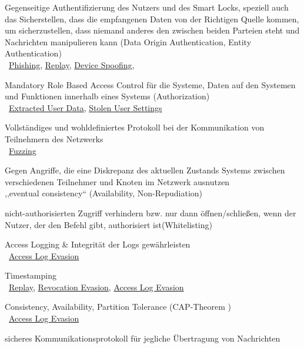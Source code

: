     \begin{SA}[noitemsep]
        \item \label{sa:1}Gegenseitige Authentifizierung des Nutzers und des Smart Locks, speziell auch das Sicherstellen, dass die empfangenen Daten von der Richtigen Quelle kommen, um sicherzustellen, dass niemand anderes den zwischen beiden Parteien steht und Nachrichten manipulieren kann (Data Origin Authentication, Entity Authentication)\\
            \textrightarrow\ \hyperref[vuln:phishing]{Phishing}, \hyperref[vuln:replay]{Replay}, \hyperref[vuln:spoofing]{Device Spoofing}, 
        \item \label{sa:2}Mandatory Role Based Access Control für die Systeme, Daten auf den Systemen und Funktionen innerhalb eines Systems (Authorization) \cite{Miessler2015}\\ 
            \textrightarrow\ \hyperref[vuln:userdata]{Extracted User Data}, \hyperref[vuln:usersettings]{Stolen User Settings}
        \item \label{sa:3}Vollständiges und wohldefiniertes Protokoll bei der Kommunikation von Teilnehmern des Netzwerks\\
            \textrightarrow\ \hyperref[vuln:fuzzing]{Fuzzing}
        \item \label{sa:4}Gegen Angriffe, die eine Diskrepanz des aktuellen Zustands Systems zwischen verschiedenen Teilnehmer und Knoten im Netzwerk ausnutzen\\
            \textrightarrow ,,eventual consistency`` (Availability, Non-Repudiation)\cite{Ho2016}
        \item \label{sa:5}nicht-authorisierten Zugriff verhindern bzw. nur dann öffnen/schließen, wenn der Nutzer, der den Befehl gibt, authorisiert ist(Whitelisting) \cite{Ho2016}
        \item \label{sa:6}Access Logging \& Integrität der Logs gewährleisten\\
            \textrightarrow\ \hyperref[vuln:accesslogevasion]{Access Log Evasion}
        \item \label{sa:7}Timestamping\\
            \textrightarrow\ \hyperref[vuln:replay]{Replay}, \hyperref[vuln:revocationevasion]{Revocation Evasion}, \hyperref[vuln:accesslogevasion]{Access Log Evasion}
        \item \label{sa:8}Consistency, Availability, Partition Tolerance (CAP-Theorem \cite{Brewer2012})\\
            \textrightarrow\ \hyperref[vuln:accesslogevasion]{Access Log Evasion}
        \item sicheres Kommunikationsprotokoll für jegliche Übertragung von Nachrichten\cite{Miessler,Ye2017}
    \end{SA}
